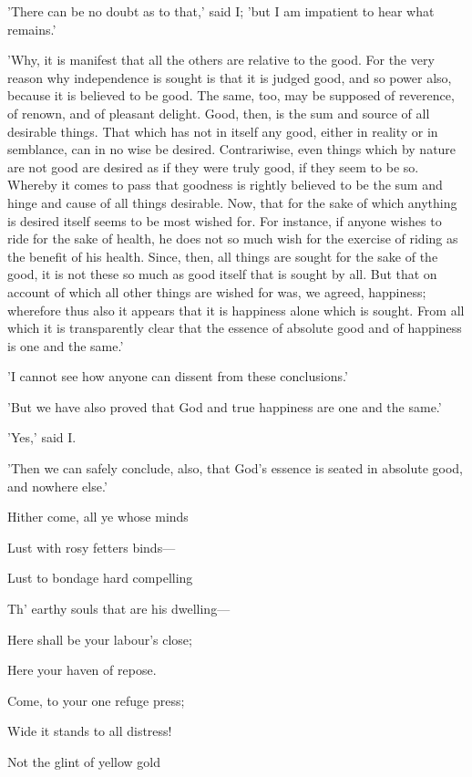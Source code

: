 'There can be no doubt as to that,' said I; 'but I am impatient to hear
what remains.'

'Why, it is manifest that all the others are relative to the good. For
the very reason why independence is sought is that it is judged good,
and so power also, because it is believed to be good. The same, too, may
be supposed of reverence, of renown, and of pleasant delight. Good,
then, is the sum and source of all desirable things. That which has not
in itself any good, either in reality or in semblance, can in no wise be
desired. Contrariwise, even things which by nature are not good are
desired as if they were truly good, if they seem to be so. Whereby it
comes to pass that goodness is rightly believed to be the sum and hinge
and cause of all things desirable. Now, that for the sake of which
anything is desired itself seems to be most wished for. For instance, if
anyone wishes to ride for the sake of health, he does not so much wish
for the exercise of riding as the benefit of his health. Since, then,
all things are sought for the sake of the good, it is not these so much
as good itself that is sought by all. But that on account of which all
other things are wished for was, we agreed, happiness; wherefore thus
also it appears that it is happiness alone which is sought. From all
which it is transparently clear that the essence of absolute good and of
happiness is one and the same.'

'I cannot see how anyone can dissent from these conclusions.'

'But we have also proved that God and true happiness are one and the
same.'

'Yes,' said I.

'Then we can safely conclude, also, that God's essence is seated in
absolute good, and nowhere else.'


Hither come, all ye whose minds

Lust with rosy fetters binds—

Lust to bondage hard compelling

Th' earthy souls that are his dwelling—

Here shall be your labour's close;

Here your haven of repose.

Come, to your one refuge press;

Wide it stands to all distress!

Not the glint of yellow gold

